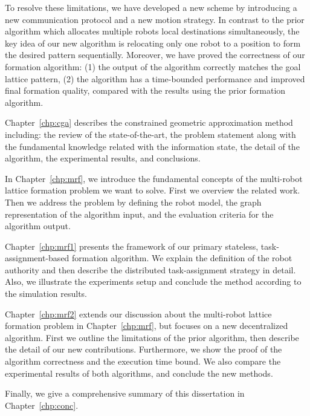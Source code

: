 To resolve these limitations, we have developed a new scheme by introducing a new communication protocol and a new motion strategy. 
In contrast to the prior algorithm which allocates multiple robots local destinations simultaneously,
the key idea of our new algorithm is relocating only one robot to a position to form the desired pattern sequentially.
Moreover, we have proved the correctness of our formation algorithm: (1) the
output of the algorithm correctly matches the goal lattice pattern, (2) the
algorithm has a time-bounded performance and improved final formation quality, 
compared with the results using the prior formation algorithm.

Chapter~\ref{chp:cga} describes the constrained geometric approximation method 
including: the review of the state-of-the-art,
the problem statement along with the fundamental knowledge related with the
information state, the detail of the algorithm, the experimental results, and conclusions.

In Chapter~\ref{chp:mrf}, we introduce the fundamental concepts of the multi-robot lattice formation problem we want to solve. 
% 
First we overview the related work. 
%
Then we address the problem by defining the robot model, the graph representation of the algorithm input, and the evaluation criteria for the algorithm output. 

Chapter~\ref{chp:mrf1} presents the framework of our primary stateless, task-assignment-based formation algorithm. 
%
We explain the definition of the robot authority and then describe the distributed task-assignment strategy in detail.
%
Also, we illustrate the experiments setup and conclude the method according to the simulation results.

Chapter~\ref{chp:mrf2} extends our discussion about the multi-robot lattice formation problem in Chapter~\ref{chp:mrf}, but focuses on a new decentralized algorithm. 
First we outline the limitations of the prior algorithm, then describe the detail of our new contributions.
Furthermore, we show the proof of the algorithm correctness and the execution time bound.
We also compare the experimental results of both algorithms, and conclude the new methods.

Finally, we give a comprehensive summary of this dissertation in Chapter~\ref{chp:conc}.

